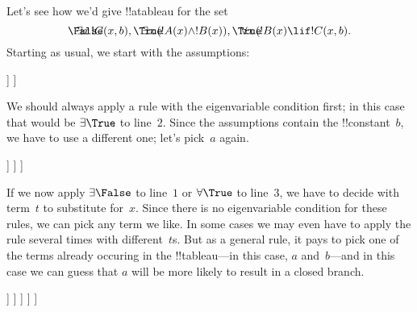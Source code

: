 \documentclass[../../../include/open-logic-section]{subfiles}
\begin{document}
\begin{ex}
Let's see how we'd give !!a{tableau} for the set
\[
\sFmla{\False}{\lexists[x][!C(x,b)]},
\sFmla{\True}{\lexists[x][(!A(x) \land !B(x))]},
\sFmla{\True}{\lforall[x][(!B(x) \lif !C(x,b)]}.
\]
Starting as usual, we start with the assumptions:
\begin{oltableau}
  [\sFmla{\False}{\lexists[x][\formula{C}(x,b)]}, just=\TAss
    [\sFmla{\True}{\lexists[x][(\formula{A}(x) \land \formula{B}(x))]},
      just=\TAss
      [\sFmla{\True}{\lforall[x][(\formula{B}(x) \lif \formula{C}(x,b)]},
        just=\TAss]
    ]
  ]
\end{oltableau}
We should always apply a rule with the eigenvariable condition first;
in this case that would be $\TRule{\True}{\lexists}$ to
line~$2$. Since the assumptions contain the !!{constant}~$b$, we have
to use a different one; let's pick~$a$ again.
\begin{oltableau}
  [\sFmla{\False}{\lexists[x][\formula{C}(x,b)]}, just=\TAss
    [\sFmla{\True}{\lexists[x][(\formula{A}(x) \land \formula{B}(x))]},
      just=\TAss, checked
      [\sFmla{\True}{\lforall[x][(\formula{B}(x) \lif \formula{C}(x,b)]},
        just=\TAss
        [\sFmla{\True}{\formula{A}(a) \land \formula{B}(a)},
          just={\TRule{\True}{\lexists}[2]}]
      ]
    ]
  ]
\end{oltableau}
If we now apply $\TRule{\False}{\lexists}$ to line~$1$ or
$\TRule{\True}{\lforall}$ to line~$3$, we have to decide with term~$t$
to substitute for~$x$. Since there is no eigenvariable condition for
these rules, we can pick any term we like. In some cases we may even
have to apply the rule several times with different~$t$s. But as a
general rule, it pays to pick one of the terms already occuring in the
!!{tableau}---in this case, $a$ and~$b$---and in this case we can
guess that $a$ will be more likely to result in a closed branch.
\begin{oltableau}
  [\sFmla{\False}{\lexists[x][\formula{C}(x,b)]}, just=\TAss
    [\sFmla{\True}{\lexists[x][(\formula{A}(x) \land \formula{B}(x))]},
      just=\TAss, checked
      [\sFmla{\True}{\lforall[x][(\formula{B}(x) \lif \formula{C}(x,b)]}, just=\TAss
        [\sFmla{\True}{\formula{A}(a) \land \formula{B}(a)}, just={\TRule{\True}{\lexists}[2]}
          [\sFmla{\False}{\formula{C}(a,b)}, just={\TRule{\False}{\lexists}[1]}
            [\sFmla{\True}{\formula{B}(a) \lif \formula{C}(a,b)},
              just={\TRule{\True}{\lforall}[1]}
            ]
          ]
        ]
      ]
    ]
  ]
\end{oltableau}

\end{ex}
\end{document}
